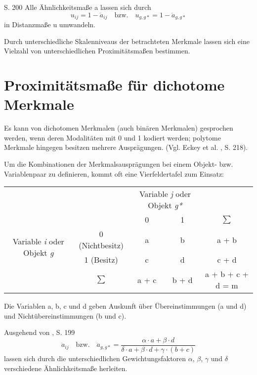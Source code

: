 \cite{Bacher.2010} S. 200 Alle Ähnlichkeitsmaße a lassen sich durch 
\begin{equation}
u_{ij} = 1 - \ddot{a}_{ij} \quad \text{bzw.} \quad u_{g,g*} = 1- \ddot{a}_{g,g*}
\end{equation}
in Distanzmaße u umwandeln.

Durch unterschiedliche Skalenniveaus der betrachteten Merkmale lassen sich eine Vielzahl von unterschiedlichen Proximitätsmaßen bestimmen.

\section{Proximitätsmaße für dichotome Merkmale}
Es kann von dichotomen Merkmalen (auch binären Merkmalen) gesprochen werden, wenn deren Modalitäten mit 0 und 1 kodiert werden; polytome Merkmale hingegen besitzen mehrere Ausprägungen. (Vgl. Eckey et al. \cite{Eckey.2002}, S. 218). 

Um die Kombinationen der Merkmalsausprägungen bei einem Objekt- bzw. Variablenpaar zu definieren, kommt oft eine Vierfeldertafel zum Einsatz: \\

\begin{tabular}{cc|cc|c}
	& & \multicolumn{2}{c|}{Variable \textit{j} oder Objekt \textit{g*}} & \\ 
	& & 0 & 1 & $\sum$ \\ \hline
	\multirow{2}{*}{Variable \textit{i} oder Objekt \textit{g}} & 0 (Nichtbesitz) & a & b & a + b \\
	& 1 (Besitz) & c & d & c + d \\ \hline
	& $\sum$ & a + c & b + d & a + b + c + d = m \\ 
\end{tabular}
\bigskip
Die Variablen a, b, c und d geben Auskunft über Übereinstimmungen (a und d) und Nichtübereinstimmungen (b und c).

Ausgehend von \cite{Bacher.2010}, S. 199
\begin{equation}
\ddot{a}_{ij} \quad \text{bzw.} \quad \ddot{a}_{g,g*} = \frac{\alpha \cdot a + \beta \cdot d}{\delta \cdot a + \beta \cdot d + \gamma \cdot (b + c)}
\end{equation}
lassen sich durch die unterschiedlichen Gewichtungsfaktoren $\alpha$, $\beta$, $\gamma$ und $\delta$  verschiedene Ähnlichkeitsmaße herleiten.

